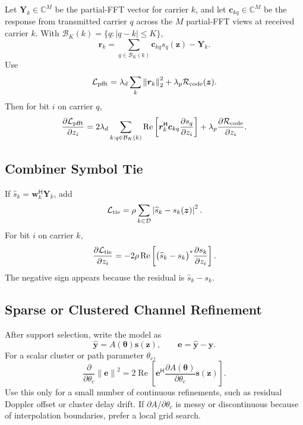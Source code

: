 \documentclass[11pt]{article}
\newcommand{\C}{\mathbb C}
\newcommand{\Hh}{^{\mathsf H}}
\newcommand{\norm}[1]{\left\lVert #1 \right\rVert}
\newcommand{\abs}[1]{\left\lvert #1 \right\rvert}
\newcommand{\Ree}{\operatorname{Re}}
\begin{document}
Let $\bm Y_k\in\C^M$ be the partial-FFT vector for carrier $k$, and let
$\bm c_{kq}\in\C^M$ be the response from transmitted carrier $q$ across
the $M$ partial-FFT views at received carrier $k$.  With
$\mathcal B_K(k)=\{q:\abs{q-k}\le K\}$,
\begin{equation}
  \bm r_k
  =
  \sum_{q\in\mathcal B_K(k)}\bm c_{kq}s_q(\bm z)-\bm Y_k.
\end{equation}
Use
\begin{equation}
  \mathcal L_{\rm pfft}
  =
  \lambda_d\sum_k\norm{\bm r_k}_2^2
  +\lambda_p\mathcal R_{\rm code}(\bm z).
\end{equation}
Then for bit $i$ on carrier $q$,
\begin{equation}
  \frac{\partial \mathcal L_{\rm pfft}}{\partial z_i}
  =
  2\lambda_d
  \sum_{k:q\in\mathcal B_K(k)}
  \Ree\left[
    \bm r_k\Hh\bm c_{kq}\frac{\partial s_q}{\partial z_i}
  \right]
  +\lambda_p
  \frac{\partial\mathcal R_{\rm code}}{\partial z_i}.
  \label{eq:pfft_gradient}
\end{equation}

\subsection{Combiner Symbol Tie}

If $\widehat s_k=\bm w_k\Hh\bm Y_k$, add
\begin{equation}
  \mathcal L_{\rm tie}
  =
  \rho\sum_{k\in\mathcal D}\abs{\widehat s_k-s_k(\bm z)}^2 .
\end{equation}
For bit $i$ on carrier $k$,
\begin{equation}
  \frac{\partial \mathcal L_{\rm tie}}{\partial z_i}
  =
  -2\rho\Ree\left[
    \big(\widehat s_k-s_k\big)^*
    \frac{\partial s_k}{\partial z_i}
  \right].
  \label{eq:tie_gradient}
\end{equation}
The negative sign appears because the residual is $\widehat s_k-s_k$.

\subsection{Sparse or Clustered Channel Refinement}

After support selection, write the model as
\begin{equation}
  \widehat{\bm y}=A(\bm\theta)\bm s(\bm z),\qquad
  \bm e=\widehat{\bm y}-\bm y.
\end{equation}
For a scalar cluster or path parameter $\theta_c$,
\begin{equation}
  \frac{\partial}{\partial\theta_c}\norm{\bm e}^2
  =
  2\Ree\left[
    \bm e\Hh
    \frac{\partial A(\bm\theta)}{\partial\theta_c}
    \bm s(\bm z)
  \right].
  \label{eq:theta_gradient}
\end{equation}
Use this only for a small number of continuous refinements, such as residual
Doppler offset or cluster delay drift.  If $\partial A/\partial\theta_c$ is
messy or discontinuous because of interpolation boundaries, prefer a local grid
search.
\end{document}
